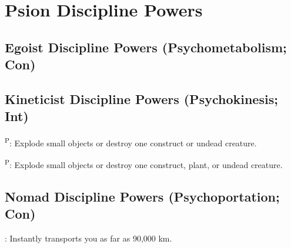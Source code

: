 \section{Psion Discipline Powers}



\subsection{Egoist Discipline Powers {\normalsize(Psychometabolism; Con)}}
\begin{enumerate*}
\item
\item
\item
\item
\item
\item
\item
\item
\item
\end{enumerate*}



\subsection{Kineticist Discipline Powers {\normalsize(Psychokinesis; Int)}}
\begin{enumerate*}
\item
\item
\item
\item
\item {}\textsuperscript{P}: Explode small objects or destroy one construct or undead creature.
\item
\item {}\textsuperscript{P}: Explode small objects or destroy one construct, plant, or undead creature.
\item
\item
\end{enumerate*}



\subsection{Nomad Discipline Powers {\normalsize(Psychoportation; Con)}}
\begin{enumerate*}
\item
\item
\item
\item
\item {}: Instantly transports you as far as 90,000 km.
\item
\item
\item
\item
\end{enumerate*}



